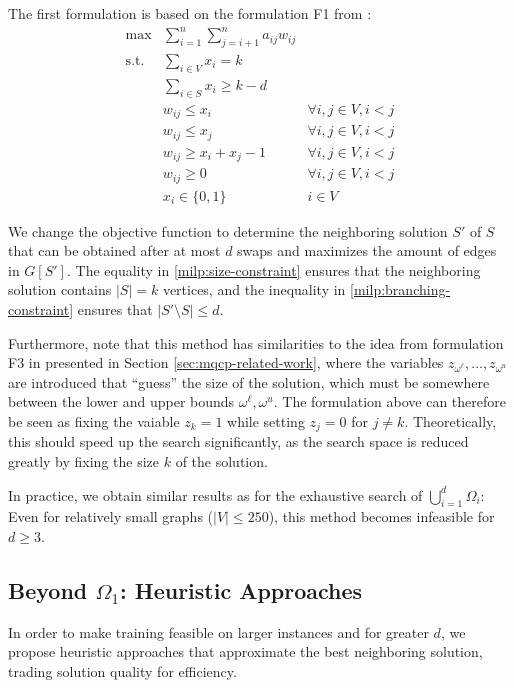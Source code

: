 \documentclass[draft,final]{vutinfth} %
\begin{document}
The first formulation is based on the formulation F1 from \cite{pattillo_maximum_2013}:  
\begin{align}
    \max & \sum_{i=1}^n \sum_{j=i+1}^n a_{ij} w_{ij}  &\\
    \text{s.t. } & \sum_{i \in V} x_i = k & \label{milp:size-constraint} \\
    & \sum_{i \in S} x_i \geq k - d  &  \label{milp:branching-constraint}\\
     & w_{ij} \leq x_i & \forall i, j \in V, i < j\\
     & w_{ij} \leq x_j & \forall i, j \in V, i < j\\
     & w_{ij} \geq x_i + x_j - 1 & \forall i, j \in V, i < j\\
    & w_{ij} \geq 0 & \forall i, j \in V, i < j \\
    & x_i \in \{0,1\} & i \in V
\end{align}

We change the objective function to determine the neighboring solution $S'$ of $S$ that can be obtained after at most $d$ swaps and maximizes the amount of edges in $G[S']$. The equality in \ref{milp:size-constraint} ensures that the neighboring solution contains $|S| = k$ vertices, and the inequality in \ref{milp:branching-constraint} ensures that $|S' \setminus S| \leq d$. 

Furthermore, note that this method has similarities to the idea from formulation F3 in \cite{VeremyevPBP16} presented in Section \ref{sec:mqcp-related-work}, where the variables $z_{\omega^\ell}, \dots, z_{\omega^u}$ are introduced that ``guess'' the size of the solution, which must be somewhere between the lower and upper bounds $\omega^\ell, \omega^u$. The formulation above can therefore be seen as fixing the vaiable $z_k = 1$ while setting $z_j = 0$ for $j \neq k$. Theoretically, this should speed up the search significantly, as the search space is reduced greatly by fixing the size $k$ of the solution.  

In practice, we obtain similar results as for the exhaustive search of $\bigcup_{i=1}^d \Omega_i$: Even for relatively small graphs ($|V| \leq 250$), this method becomes infeasible for $d \geq 3$. 

\subsection{Beyond $\Omega_1$: Heuristic Approaches}

In order to make training feasible on larger instances and for greater $d$, we propose heuristic approaches that approximate the best neighboring solution, trading solution quality for efficiency. 
\end{document}
